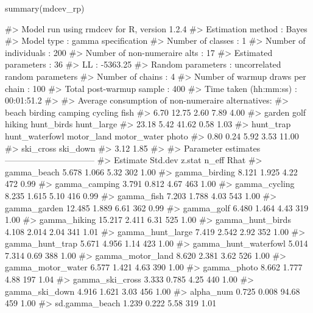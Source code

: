 \begin{example}
summary(mdcev_rp)

#> Model run using rmdcev for R, version 1.2.4 
#> Estimation method                : Bayes
#> Model type                       : gamma specification
#> Number of classes                : 1
#> Number of individuals            : 200
#> Number of non-numeraire alts     : 17
#> Estimated parameters             : 36
#> LL                               : -5363.25
#> Random parameters                : uncorrelated random parameters
#> Number of chains                 : 4
#> Number of warmup draws per chain : 100
#> Total post-warmup sample         : 400
#> Time taken (hh:mm:ss)            : 00:01:51.2
#> 
#> Average consumption of non-numeraire alternatives:
#>          beach        birding        camping        cycling           fish 
#>           6.70          12.75           2.60           7.89           4.00 
#>         garden           golf         hiking     hunt_birds     hunt_large 
#>          23.18           5.42          41.62           0.58           1.03 
#>      hunt_trap hunt_waterfowl     motor_land    motor_water          photo 
#>           0.80           0.24           5.92           3.53          11.00 
#>      ski_cross       ski_down 
#>           3.12           1.85 
#> 
#> Parameter estimates --------------------------------  
#>                         Estimate Std.dev z.stat n_eff Rhat
#> gamma_beach                5.678   1.066   5.32   302 1.00
#> gamma_birding              8.121   1.925   4.22   472 0.99
#> gamma_camping              3.791   0.812   4.67   463 1.00
#> gamma_cycling              8.235   1.615   5.10   416 0.99
#> gamma_fish                 7.203   1.788   4.03   543 1.00
#> gamma_garden              12.485   1.889   6.61   362 0.99
#> gamma_golf                 6.480   1.464   4.43   319 1.00
#> gamma_hiking              15.217   2.411   6.31   525 1.00
#> gamma_hunt_birds           4.108   2.014   2.04   341 1.01
#> gamma_hunt_large           7.419   2.542   2.92   352 1.00
#> gamma_hunt_trap            5.671   4.956   1.14   423 1.00
#> gamma_hunt_waterfowl       5.014   7.314   0.69   388 1.00
#> gamma_motor_land           8.620   2.381   3.62   526 1.00
#> gamma_motor_water          6.577   1.421   4.63   390 1.00
#> gamma_photo                8.662   1.777   4.88   197 1.04
#> gamma_ski_cross            3.333   0.785   4.25   440 1.00
#> gamma_ski_down             4.916   1.621   3.03   456 1.00
#> alpha_num                  0.725   0.008  94.68   459 1.00
#> sd.gamma_beach             1.239   0.222   5.58   319 1.01

\end{example}
